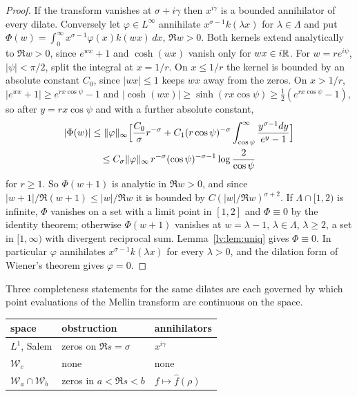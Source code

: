\begin{proof}
If the transform vanishes at $\sigma+i\gamma$ then $x^{i\gamma}$ is a bounded annihilator of every dilate. Conversely let $\varphi\in L^\infty$ annihilate $x^{\sigma-1}k(\lambda x)$ for $\lambda\in\Lambda$ and put $\Phi(w)=\int_0^\infty x^{\sigma-1}\varphi(x)k(wx)\,dx$, $\Re w>0$. Both kernels extend analytically to $\Re w>0$, since $e^{wx}+1$ and $\cosh(wx)$ vanish only for $wx\in i\mathbb{R}$. For $w=re^{i\psi}$, $|\psi|<\pi/2$, split the integral at $x=1/r$. On $x\le1/r$ the kernel is bounded by an absolute constant $C_0$, since $|wx|\le1$ keeps $wx$ away from the zeros. On $x>1/r$, $|e^{wx}+1|\ge e^{rx\cos\psi}-1$ and $|\cosh(wx)|\ge\sinh(rx\cos\psi)\ge\frac12(e^{rx\cos\psi}-1)$, so after $y=rx\cos\psi$ and with a further absolute constant,
\begin{multline*}
|\Phi(w)|\le\|\varphi\|_\infty\Bigl[\frac{C_0}\sigma r^{-\sigma}+C_1(r\cos\psi)^{-\sigma}\int_{\cos\psi}^\infty\frac{y^{\sigma-1}dy}{e^{y}-1}\Bigr]\\
\le C_\sigma\|\varphi\|_\infty\,r^{-\sigma}(\cos\psi)^{-\sigma-1}\log\frac{2}{\cos\psi}
\end{multline*}
for $r\ge1$. So $\Phi(w+1)$ is analytic in $\Re w>0$, and since $|w+1|/\Re(w+1)\le|w|/\Re w$ it is bounded by $C(|w|/\Re w)^{\sigma+2}$. If $\Lambda\cap[1,2)$ is infinite, $\Phi$ vanishes on a set with a limit point in $[1,2]$ and $\Phi\equiv0$ by the identity theorem; otherwise $\Phi(w+1)$ vanishes at $w=\lambda-1$, $\lambda\in\Lambda$, $\lambda\ge2$, a set in $[1,\infty)$ with divergent reciprocal sum. Lemma~\ref{lv:lem:uniq} gives $\Phi\equiv0$. In particular $\varphi$ annihilates $x^{\sigma-1}k(\lambda x)$ for every $\lambda>0$, and the dilation form of Wiener's theorem gives $\varphi=0$.
\end{proof}

Three completeness statements for the same dilates are each governed by which point evaluations of the Mellin transform are continuous on the space.

\begin{center}\footnotesize
\begin{tabular}{lll}
\toprule
space & obstruction & annihilators\\
\midrule
$L^1$, Salem & zeros on $\Re s=\sigma$ & $x^{i\gamma}$\\
$\mathcal W_c$ & none & none\\
$\mathcal W_a\cap\mathcal W_b$ & zeros in $a<\Re s<b$ & $f\mapsto\widehat f(\rho)$\\
\bottomrule
\end{tabular}
\end{center}

